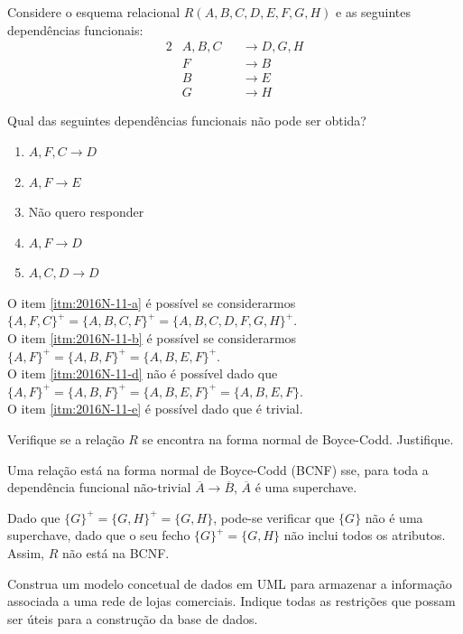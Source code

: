 \documentclass[type=normal, year=2015/16]{bdad_exam}
\begin{document}
{
Considere o esquema relacional $R(A,B,C,D,E,F,G,H)$ e as seguintes dependências funcionais:
\begin{alignat*}{2}
    & A,B,C && \rightarrow D,G,H\\
    & F     && \rightarrow B\\
    & B     && \rightarrow E\\
    & G     && \rightarrow H    
\end{alignat*}

Qual das seguintes dependências funcionais não pode ser obtida?
\begin{enumerate}[label=\alph*.]\itemsep0em
    \item \label{itm:2016N-11-a} $A,F,C \rightarrow D$
    \item \label{itm:2016N-11-b} $A,F \rightarrow E$
    \item \label{itm:2016N-11-c} Não quero responder
    \item \label{itm:2016N-11-d} \textbf{$A,F \rightarrow D$ \greencheckmark}
    \item \label{itm:2016N-11-e} $A,C,D \rightarrow D$
\end{enumerate}
O item \ref{itm:2016N-11-a} é possível se considerarmos $\{A,F,C\}^+=\{A,B,C,F\}^+=\{A,B,C,D,F,G,H\}^+$.\\
O item \ref{itm:2016N-11-b} é possível se considerarmos $\{A,F\}^+=\{A,B,F\}^+=\{A,B,E,F\}^+$.\\
O item \ref{itm:2016N-11-d} não é possível dado que $\{A,F\}^+=\{A,B,F\}^+=\{A,B,E,F\}^+=\{A,B,E,F\}$.\\
O item \ref{itm:2016N-11-e} é possível dado que é trivial.

Verifique se a relação $R$ se encontra na forma normal de Boyce-Codd. Justifique.

\ansseparator

Uma relação está na forma normal de Boyce-Codd (BCNF) sse, para toda a dependência funcional não-trivial $\overline{A} \rightarrow \overline{B}$, $\overline{A}$ é uma superchave.

Dado que $\{G\}^+=\{G,H\}^+=\{G,H\}$, pode-se verificar que $\{G\}$ não é uma superchave, dado que o seu fecho $\{G\}^+=\{G,H\}$ não inclui todos os atributos. Assim, $R$ não está na BCNF.

Construa um modelo concetual de dados em UML para armazenar a informação associada a uma rede de lojas comerciais. Indique todas as restrições que possam ser úteis para a construção da base de dados.

}
\end{document}
